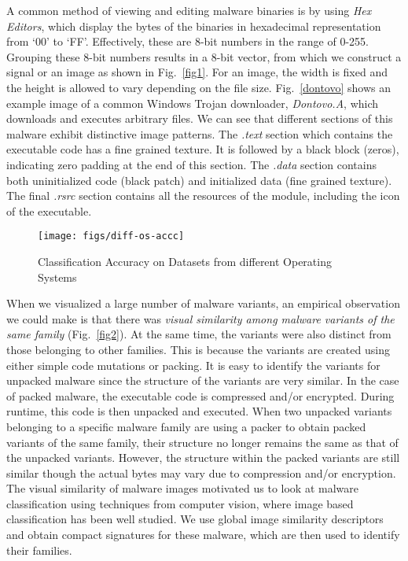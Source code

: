 \documentclass[journal]{IEEEtran}
\begin{document}
 A common method of viewing and editing malware binaries is by using \emph{Hex Editors}, which display the bytes of the binaries in hexadecimal representation from `00' to `FF'.
Effectively, these are 8-bit numbers in the range of 0-255.
Grouping these 8-bit numbers results in a 8-bit vector, from which we construct a signal or an image as shown in Fig.~\ref{fig1}.
For an image, the width is fixed and the height is allowed to vary depending on the file size.
Fig.~\ref{dontovo} shows an example image of a common Windows Trojan downloader, \emph{Dontovo.A}, which downloads and executes arbitrary files.
We can see that different sections of this malware exhibit distinctive image patterns.
The \emph{.text} section which contains the executable code has a fine grained texture.
It is followed by a black block (zeros), indicating zero padding at the end of this section. 
The \emph{.data} section contains both uninitialized code (black patch) and
initialized data (fine grained texture). 
The final \emph{.rsrc} section contains all the resources of the module, including the icon of the executable. 


\begin{figure}[h]
\centering
{\texttt{[image: figs/diff-os-accc]}}
\caption{Classification Accuracy on Datasets from different Operating Systems}
\label{diff-os-acc}
\vspace{-10pt}
\end{figure} 

 When we visualized a large number of malware variants, an empirical observation we could make is that there was \emph{visual similarity among malware variants of the same family} (Fig.~\ref{fig2}).
At the same time, the variants were also distinct from those belonging to other families. 
This is because the variants are created using either simple code mutations or packing.
It is easy to identify the variants for unpacked malware since the structure of the variants are very similar. 
In the case of packed malware, the executable code is compressed and/or encrypted.
During runtime, this code is then unpacked and executed.
When two unpacked variants belonging to a specific malware family are using a packer to obtain packed variants of the same family, their structure no longer remains the same as that of the unpacked variants.
However, the structure within the packed variants are still similar though the actual bytes may vary due to compression and/or encryption.
The visual similarity of malware images motivated us to look at malware classification using techniques from computer vision, where image based classification has been well studied.
We use global image similarity descriptors and obtain compact signatures for these malware, which are then used to identify their families. 
\end{document}
